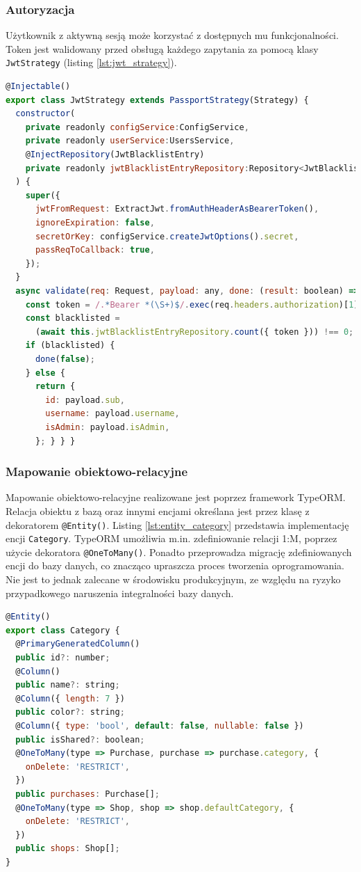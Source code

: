 \subsubsection{Autoryzacja}
Użytkownik z aktywną sesją może korzystać z dostępnych mu funkcjonalności. Token jest walidowany przed obsługą każdego zapytania za pomocą klasy \lstinline{JwtStrategy} (listing \ref{lst:jwt_strategy}). 

\begin{lstlisting}[language=JavaScript, caption={Klasa \lstinline{JwtStrategy}.}, label=lst:jwt_strategy]
@Injectable()
export class JwtStrategy extends PassportStrategy(Strategy) {
  constructor(
    private readonly configService:ConfigService,
    private readonly userService:UsersService,
    @InjectRepository(JwtBlacklistEntry)
    private readonly jwtBlacklistEntryRepository:Repository<JwtBlacklistEntry>,
  ) {
    super({
      jwtFromRequest: ExtractJwt.fromAuthHeaderAsBearerToken(),
      ignoreExpiration: false,
      secretOrKey: configService.createJwtOptions().secret,
      passReqToCallback: true,
    });
  }
  async validate(req: Request, payload: any, done: (result: boolean) => void) {
    const token = /.*Bearer *(\S+)$/.exec(req.headers.authorization)[1];
    const blacklisted =
      (await this.jwtBlacklistEntryRepository.count({ token })) !== 0;
    if (blacklisted) {
      done(false);
    } else {
      return {
        id: payload.sub,
        username: payload.username,
        isAdmin: payload.isAdmin,
      }; } } }
\end{lstlisting}

\subsubsection{Mapowanie obiektowo-relacyjne}
Mapowanie obiektowo-relacyjne realizowane jest poprzez framework TypeORM. Relacja obiektu z bazą oraz innymi encjami określana jest przez klasę z dekoratorem \lstinline{@Entity()}. Listing \ref{lst:entity_category} przedstawia implementację encji \lstinline{Category}. TypeORM umożliwia m.in. zdefiniowanie relacji 1:M, poprzez użycie dekoratora \lstinline{@OneToMany()}. Ponadto przeprowadza migrację zdefiniowanych encji do bazy danych, co znacząco upraszcza proces tworzenia oprogramowania. Nie jest to jednak zalecane w środowisku produkcyjnym, ze względu na ryzyko przypadkowego naruszenia integralności bazy danych.
\newpage
\begin{lstlisting}[language=JavaScript, caption={Encja \lstinline{Category}.}, label=lst:entity_category]
@Entity()
export class Category {
  @PrimaryGeneratedColumn()
  public id?: number;
  @Column()
  public name?: string;
  @Column({ length: 7 })
  public color?: string;
  @Column({ type: 'bool', default: false, nullable: false })
  public isShared?: boolean;
  @OneToMany(type => Purchase, purchase => purchase.category, {
    onDelete: 'RESTRICT',
  })
  public purchases: Purchase[];
  @OneToMany(type => Shop, shop => shop.defaultCategory, {
    onDelete: 'RESTRICT',
  })
  public shops: Shop[]; 
}
\end{lstlisting}

